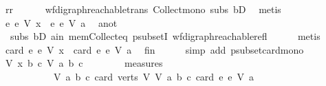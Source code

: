 \begin{isabellebody}
\ rr\isanewline
\ \ \ \ \ \ wf{\isacharunderscore}{\kern0pt}digraph{\isachardot}{\kern0pt}reachable{\isacharunderscore}{\kern0pt}trans\ Collect{\isacharunderscore}{\kern0pt}mono\ subs\ bD{}\ \isamarkupfalse%
\ metis\isanewline
\ \ \isamarkupfalse%
\ \isamarkupfalse%
\ {\isachardoublequoteopen}{\isacharbraceleft}{\kern0pt}e{\isachardot}{\kern0pt}\ e\ {\isasymrightarrow}\isactrlsup {\isacharasterisk}{\kern0pt}\isactrlbsub V\isactrlesub \ x{\isacharbraceright}{\kern0pt}\ {\isasymsubset}\ {\isacharbraceleft}{\kern0pt}e{\isachardot}{\kern0pt}\ e\ {\isasymrightarrow}\isactrlsup {\isacharasterisk}{\kern0pt}\isactrlbsub V\isactrlesub \ a{\isacharbraceright}{\kern0pt}{\isachardoublequoteclose}\ \isamarkupfalse%
\ a{\isacharunderscore}{\kern0pt}not\isanewline
\ \ subs\ bD{}\ a{\isacharunderscore}{\kern0pt}in\ mem{\isacharunderscore}{\kern0pt}Collect{\isacharunderscore}{\kern0pt}eq\ psubsetI\ wf{\isacharunderscore}{\kern0pt}digraph{\isachardot}{\kern0pt}reachable{\isacharunderscore}{\kern0pt}refl\isanewline
\ \ \ \ \isamarkupfalse%
\ metis\ \isanewline
\ \ \isamarkupfalse%
\ \isamarkupfalse%
\ {\isachardoublequoteopen}card\ {\isacharbraceleft}{\kern0pt}e{\isachardot}{\kern0pt}\ e\ {\isasymrightarrow}\isactrlsup {\isacharasterisk}{\kern0pt}\isactrlbsub V\isactrlesub \ x{\isacharbraceright}{\kern0pt}\ {\isacharless}{\kern0pt}\ card\ {\isacharbraceleft}{\kern0pt}e{\isachardot}{\kern0pt}\ e\ {\isasymrightarrow}\isactrlsup {\isacharasterisk}{\kern0pt}\isactrlbsub V\isactrlesub \ a{\isacharbraceright}{\kern0pt}{\isachardoublequoteclose}\ \isamarkupfalse%
\ fin\isanewline
\ \ \ \ \isamarkupfalse%
\ {\isacharparenleft}{\kern0pt}simp\ add{\isacharcolon}{\kern0pt}\ psubset{\isacharunderscore}{\kern0pt}card{\isacharunderscore}{\kern0pt}mono{\isacharparenright}{\kern0pt}\isanewline
\ \ \isamarkupfalse%
\ \isamarkupfalse%
\ {\isachardoublequoteopen}{\isacharparenleft}{\kern0pt}{\isacharparenleft}{\kern0pt}V{\isacharcomma}{\kern0pt}\ x{\isacharcomma}{\kern0pt}\ b{\isacharcomma}{\kern0pt}\ c{\isacharparenright}{\kern0pt}{\isacharcomma}{\kern0pt}\ V{\isacharcomma}{\kern0pt}\ a{\isacharcomma}{\kern0pt}\ b{\isacharcomma}{\kern0pt}\ c{\isacharparenright}{\kern0pt}\isanewline
\ \ \ \ \ \ \ {\isasymin}\ measures\isanewline
\ \ \ \ \ \ \ \ \ \ \ {\isacharbrackleft}{\kern0pt}{\isasymlambda}{\isacharparenleft}{\kern0pt}V{\isacharcomma}{\kern0pt}\ a{\isacharcomma}{\kern0pt}\ b{\isacharcomma}{\kern0pt}\ c{\isacharparenright}{\kern0pt}{\isachardot}{\kern0pt}\ card\ {\isacharparenleft}{\kern0pt}verts\ V{\isacharparenright}{\kern0pt}{\isacharcomma}{\kern0pt}\ {\isasymlambda}{\isacharparenleft}{\kern0pt}V{\isacharcomma}{\kern0pt}\ a{\isacharcomma}{\kern0pt}\ b{\isacharcomma}{\kern0pt}\ c{\isacharparenright}{\kern0pt}{\isachardot}{\kern0pt}\ card\ {\isacharbraceleft}{\kern0pt}e{\isachardot}{\kern0pt}\ e\ {\isasymrightarrow}\isactrlsup {\isacharasterisk}{\kern0pt}\isactrlbsub V\isactrlesub \ a{\isacharbraceright}{\kern0pt}{\isacharbrackright}{\kern0pt}{\isachardoublequoteclose}\isanewline

\end{isabellebody}
